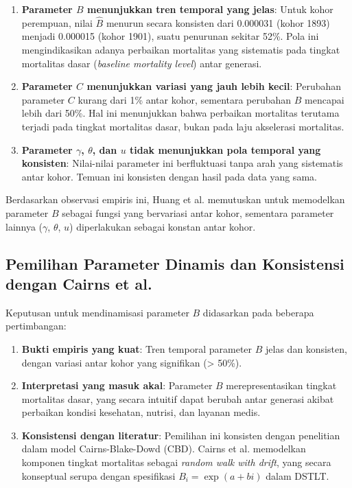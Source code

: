\begin{enumerate}
    \item \textbf{Parameter $B$ menunjukkan tren temporal yang jelas}: Untuk kohor perempuan, nilai $\hat{B}$ menurun secara konsisten dari 0.000031 (kohor 1893) menjadi 0.000015 (kohor 1901), suatu penurunan sekitar 52\%. Pola ini mengindikasikan adanya perbaikan mortalitas yang sistematis pada tingkat mortalitas dasar (\textit{baseline mortality level}) antar generasi.

    \item \textbf{Parameter $C$ menunjukkan variasi yang jauh lebih kecil}: Perubahan parameter $C$ kurang dari 1\% antar kohor, sementara perubahan $B$ mencapai lebih dari 50\%. Hal ini menunjukkan bahwa perbaikan mortalitas terutama terjadi pada tingkat mortalitas dasar, bukan pada laju akselerasi mortalitas.

    \item \textbf{Parameter $\gamma$, $\theta$, dan $u$ tidak menunjukkan pola temporal yang konsisten}: Nilai-nilai parameter ini berfluktuasi tanpa arah yang sistematis antar kohor. Temuan ini konsisten dengan hasil \citet{einmahl2019modeling} pada data yang sama.
\end{enumerate}

Berdasarkan observasi empiris ini, Huang et al. memutuskan untuk memodelkan parameter $B$ sebagai fungsi yang bervariasi antar kohor, sementara parameter lainnya ($\gamma$, $\theta$, $u$) diperlakukan sebagai konstan antar kohor.

\subsection{Pemilihan Parameter Dinamis dan Konsistensi dengan Cairns et al.}

Keputusan untuk mendinamisasi parameter $B$ didasarkan pada beberapa pertimbangan:

\begin{enumerate}
    \item \textbf{Bukti empiris yang kuat}: Tren temporal parameter $B$ jelas dan konsisten, dengan variasi antar kohor yang signifikan (> 50\%).

    \item \textbf{Interpretasi yang masuk akal}: Parameter $B$ merepresentasikan tingkat mortalitas dasar, yang secara intuitif dapat berubah antar generasi akibat perbaikan kondisi kesehatan, nutrisi, dan layanan medis.

    \item \textbf{Konsistensi dengan literatur}: Pemilihan ini konsisten dengan penelitian \citet{cairns2006pricing} dalam model Cairns-Blake-Dowd (CBD). Cairns et al. memodelkan komponen tingkat mortalitas sebagai \textit{random walk with drift}, yang secara konseptual serupa dengan spesifikasi $B_i = \exp(a + bi)$ dalam DSTLT.
\end{enumerate}

